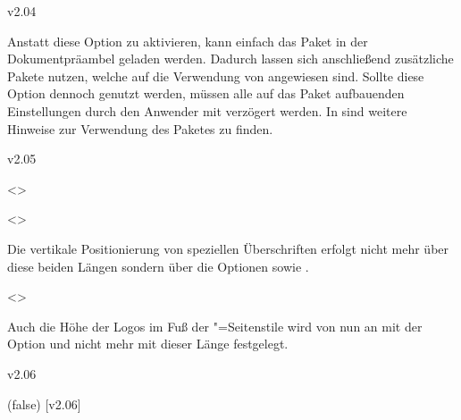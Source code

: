 \begin{NoIndexDefault}
\begin{Cessations}{v2.04}
\begin{Cessation}
Anstatt diese Option zu aktivieren, kann einfach das Paket  
in der Dokumentpräambel geladen werden. Dadurch lassen sich anschließend 
zusätzliche Pakete nutzen, welche auf die Verwendung von  
angewiesen sind. Sollte diese Option dennoch genutzt werden, müssen alle auf 
das Paket  aufbauenden Einstellungen durch den Anwender mit 
 verzögert werden. In 
 sind weitere Hinweise zur Verwendung des Paketes 
 zu finden.
\end{Cessation}
\end{Cessations}



\begin{Cessations}{v2.05}
\begin{Cessation}
  {}
  <>
\begin{Cessation}
  {}
  <>
\printdeclarationlist

Die vertikale Positionierung von speziellen Überschriften erfolgt nicht mehr 
über diese beiden Längen sondern über die Optionen  
sowie .
\end{Cessation}
\end{Cessation}


\begin{Cessation}
  {}
  <>
\printdeclarationlist

Auch die Höhe der Logos im Fuß der "=Seitenstile wird 
von nun an mit der Option  und nicht mehr mit dieser 
Länge festgelegt.
\end{Cessation}
\end{Cessations}



\begin{Cessations}{v2.06}
\begin{Declaration}
  {}
  (false)
  [v2.06]
\printdeclarationlist


\end{Declaration}
\end{Cessations}
\end{NoIndexDefault}
